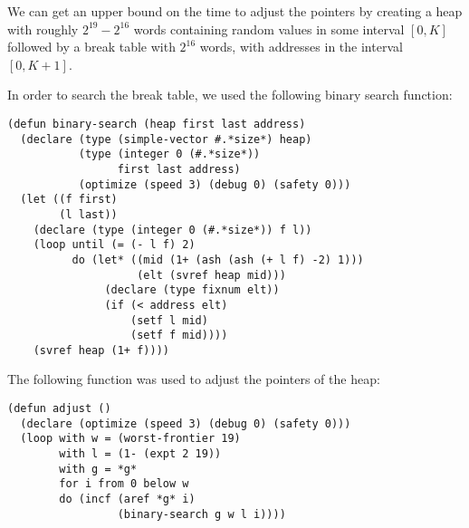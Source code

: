 We can get an upper bound on the time to adjust the pointers by
creating a heap with roughly $2^{19} - 2^{16}$ words containing random
values in some interval $[0,K]$ followed by a break table with
$2^{16}$ words, with addresses in the interval $[0,K+1]$.

In order to search the break table, we used the following binary
search function:

{\small\begin{verbatim}
(defun binary-search (heap first last address)
  (declare (type (simple-vector #.*size*) heap)
           (type (integer 0 (#.*size*)) 
                 first last address)
           (optimize (speed 3) (debug 0) (safety 0)))
  (let ((f first)
        (l last))
    (declare (type (integer 0 (#.*size*)) f l))
    (loop until (= (- l f) 2)
          do (let* ((mid (1+ (ash (ash (+ l f) -2) 1)))
                    (elt (svref heap mid)))
               (declare (type fixnum elt))
               (if (< address elt)
                   (setf l mid)
                   (setf f mid))))
    (svref heap (1+ f))))
\end{verbatim}}

The following function was used to adjust the pointers of the heap:

{\small\begin{verbatim}
(defun adjust ()
  (declare (optimize (speed 3) (debug 0) (safety 0)))
  (loop with w = (worst-frontier 19)
        with l = (1- (expt 2 19))
        with g = *g*
        for i from 0 below w
        do (incf (aref *g* i)
                 (binary-search g w l i))))
\end{verbatim}}
